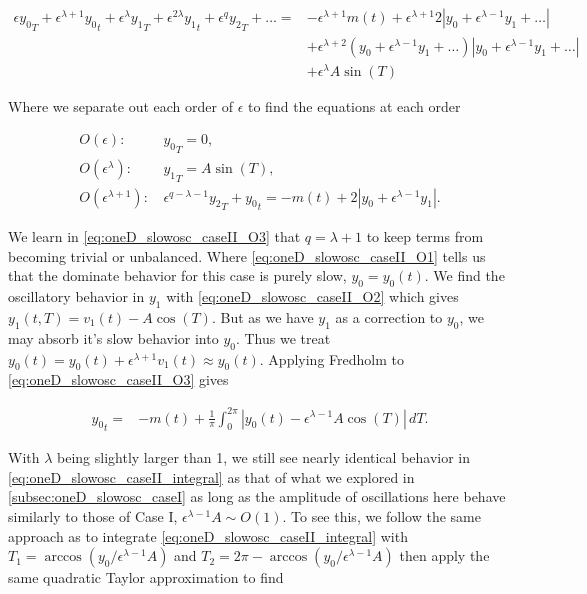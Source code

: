\begin{equation*}
\begin{aligned}
\epsilon {y_0}_T+\epsilon^{\lambda+1} {y_0}_t+\epsilon^\lambda {y_1}_T+\epsilon^{2\lambda}{y_1}_t+\epsilon^q {y_2}_T+\ldots=&-\epsilon^{\lambda+1}m(t)+\epsilon^{\lambda+1} 2|y_0+\epsilon^{\lambda-1} y_1 +\ldots|\\
&+ \epsilon^{\lambda+2}( y_0+\epsilon^{\lambda-1} y_1 +\ldots)| y_0+\epsilon^{\lambda-1} y_1 +\ldots|\\
&+\epsilon^\lambda A\sin(T) 
\end{aligned}
\end{equation*}

Where we separate out each order of $\epsilon$ to find the equations at each order

\begin{align} \label{eq:oneD_slowosc_caseII_O1}
O(\epsilon):\, &{y_0}_T=0,\\ \label{eq:oneD_slowosc_caseII_O2}
O(\epsilon^\lambda): \, & {y_1}_T = A\sin(T),\\ \label{eq:oneD_slowosc_caseII_O3}
O(\epsilon^{\lambda+1}):\, & \epsilon^{q-\lambda-1}{y_2}_T+ {y_0}_t = -m(t) +2|y_0+\epsilon^{\lambda-1}y_1|.
\end{align}

We learn in \eqref{eq:oneD_slowosc_caseII_O3} that $q=\lambda+1$ to keep terms from becoming trivial or unbalanced. Where \eqref{eq:oneD_slowosc_caseII_O1} tells us that the dominate behavior for this case is purely slow, $y_0=y_0(t)$. We find the oscillatory behavior in $y_1$ with \eqref{eq:oneD_slowosc_caseII_O2} which gives $y_1(t,T)=v_1(t)-A\cos(T)$. But as we have $y_1$ as a correction to $y_0$, we may absorb it's slow behavior into $y_0$. Thus we treat $y_0(t)=y_0(t)+\epsilon^{\lambda+1} v_1(t)\approx y_0(t)$. Applying Fredholm to \eqref{eq:oneD_slowosc_caseII_O3} gives 

\begin{equation}\label{eq:oneD_slowosc_caseII_integral}
\begin{aligned}
{y_0}_t=& -m(t)+\frac{1}{\pi}\int_0^{2\pi}|y_0(t)-\epsilon^{\lambda-1}A\cos(T)|\,dT.
\end{aligned}
\end{equation}

With $\lambda$ being slightly larger than 1, we still see nearly identical behavior in \eqref{eq:oneD_slowosc_caseII_integral} as that of what we explored in \autoref{subsec:oneD_slowosc_caseI} as long as the amplitude of oscillations here behave similarly to those of Case I, $\epsilon^{\lambda-1}A\sim O(1)$. To see this, we follow the same approach as to integrate \eqref{eq:oneD_slowosc_caseII_integral} with $T_1=\arccos(y_0/\epsilon^{\lambda-1}A)$ and $T_2=2\pi- \arccos(y_0/\epsilon^{\lambda-1}A)$ then apply the same quadratic Taylor approximation to find

